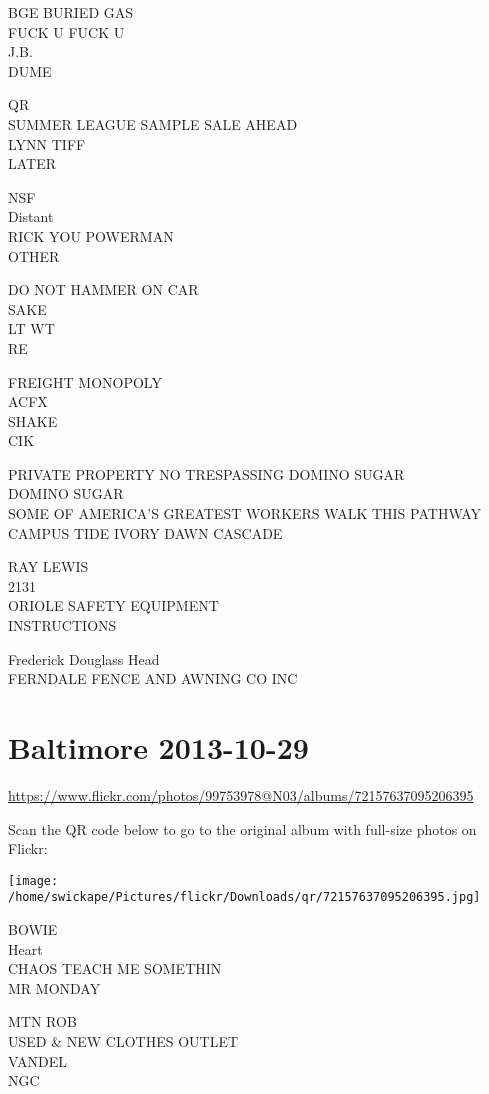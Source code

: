 \documentclass[10pt,letterpaper]{article}
\begin{document}
BGE BURIED GAS\\
FUCK U FUCK U\\
J.B.\\
DUME

QR\\
SUMMER LEAGUE SAMPLE SALE AHEAD\\
LYNN TIFF\\
LATER

NSF\\
Distant\\
RICK YOU POWERMAN\\
OTHER

DO NOT HAMMER ON CAR\\
SAKE\\
LT WT\\
RE

FREIGHT MONOPOLY\\
ACFX\\
SHAKE\\
CIK

PRIVATE PROPERTY NO TRESPASSING DOMINO SUGAR\\
DOMINO SUGAR\\
SOME OF AMERICA'S GREATEST WORKERS WALK THIS PATHWAY\\
CAMPUS TIDE IVORY DAWN CASCADE

RAY LEWIS\\
2131\\
ORIOLE SAFETY EQUIPMENT\\
INSTRUCTIONS

Frederick Douglass Head\\
FERNDALE FENCE AND AWNING CO INC


\section*{Baltimore 2013-10-29}

\url{https://www.flickr.com/photos/99753978@N03/albums/72157637095206395}

Scan the QR code below to go to the original album with full-size photos on Flickr:

\texttt{[image: /home/swickape/Pictures/flickr/Downloads/qr/72157637095206395.jpg]}


BOWIE\\
Heart\\
CHAOS TEACH ME SOMETHIN\\
MR MONDAY

MTN ROB\\
USED \& NEW CLOTHES OUTLET\\
VANDEL\\
NGC
\end{document}
